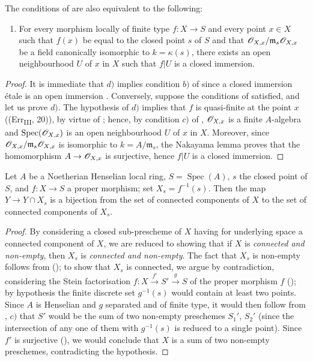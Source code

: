 \begin{remark}[18.5.18]
\label{IV.18.5.18}
The conditions of  are also equivalent to the following:
\begin{enumerate}
  \item[d)] For every morphism locally of finite type $f:X\to S$ and every point $x\in X$ such that $f(x)$ be equal to the closed point $s$ of $S$ and that $\mathscr{O}_{X,x}/\mathfrak{m}_s\mathscr{O}_{X,x}$ be a field canonically isomorphic to $k=\kappa(s)$, there exists an open neighbourhood $U$ of $x$ in $X$ such that $f|U$ is a closed immersion.
\end{enumerate}
\end{remark}

\begin{proof}
It is immediate that $d)$ implies condition $b)$ of  since a closed immersion \'etale is an open immersion .
Conversely, suppose the conditions of  satisfied, and let us prove $d)$.
The hypothesis of $d)$ implies that $f$ is quasi-finite at the point $x$ ((Err\textsubscript{III}, 20)), by virtue of ;
hence, by condition $c)$ of , $\mathscr{O}_{X,x}$ is a finite $A$-algebra and $\operatorname{Spec}(\mathscr{O}_{X,x})$ is an open neighbourhood $U$ of $x$ in $X$.
Moreover, since $\mathscr{O}_{X,x}/\mathfrak{m}_s\mathscr{O}_{X,x}$ is isomorphic to $k=A/\mathfrak{m}_s$, the Nakayama lemma proves that the homomorphism $A\to\mathscr{O}_{X,x}$ is surjective, hence $f|U$ is a closed immersion.
\end{proof}

\begin{proposition}[18.5.19]
\label{IV.18.5.19}
Let $A$ be a Noetherian Henselian local ring, $S=\operatorname{Spec}(A)$, $s$ the closed point of $S$, and $f:X\to S$ a proper morphism;
set $X_s=f^{-1}(s)$.
Then the map $Y\to Y\cap X_s$ is a bijection from the set of connected components of $X$ to the set of connected components of $X_s$.
\end{proposition}

\begin{proof}
By considering a closed sub-prescheme of $X$ having for underlying space a connected component of $X$, we are reduced to showing that if $X$ is \emph{connected and non-empty}, then $X_s$ is \emph{connected and non-empty}.
The fact that $X_s$ is non-empty follows from ();
to show that $X_s$ is connected, we argue by contradiction, considering the Stein factorisation $f:X\xrightarrow{f'}S'\xrightarrow{g}S$ of the proper morphism $f$ ();
by hypothesis the finite discrete set $g^{-1}(s)$ would contain at least two points.
Since $A$ is Henselian and $g$ separated and of finite type, it would then follow from , $c)$ that $S'$ would be the sum of two non-empty preschemes $S_1'$, $S_2'$ (since the intersection of any one of them with $g^{-1}(s)$ is reduced to a single point).
Since $f'$ is surjective (), we would conclude that $X$ is a sum of two non-empty preschemes, contradicting the hypothesis.
\end{proof}
